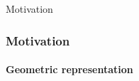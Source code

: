 \documentclass{beamer}
\begin{document}

\begin{frame}{Motivation}

\frametitle{Motivation}
\framesubtitle{Geometric representation}

\begin{figure}[h] 
\end{figure}  


\end{frame}
\end{document}
